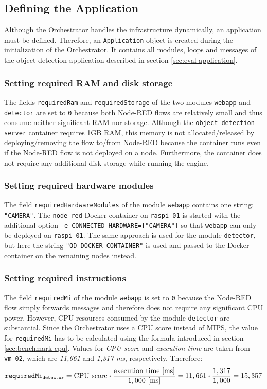 \subsection{Defining the Application\label{sec:eval-defining-application}}

Although the Orchestrator handles the infrastructure dynamically, an application must be defined. 
Therefore, an \texttt{Application} object is created during the initialization of the Orchestrator.
It contains all modules, loops and messages of the object detection application described in section \ref{sec:eval-application}.

\subsubsection*{Setting required RAM and disk storage}
The fields \texttt{requiredRam} and \texttt{requiredStorage} of the two modules \texttt{webapp} and \texttt{detector} are set to \texttt{0} because both Node-RED flows are relatively small and thus consume neither significant RAM nor storage.
Although the \texttt{object-detection-server} container requires 1GB RAM, this memory is not allocated/released by deploying/removing the flow to/from Node-RED because the container runs even if the Node-RED flow is not deployed on a node.
Furthermore, the container does not require any additional disk storage while running the engine.

\subsubsection*{Setting required hardware modules}
The field \texttt{requiredHardwareModules} of the module \texttt{webapp} contains one string: \texttt{"CAMERA"}.
The \texttt{node-red} Docker container on \texttt{raspi-01} is started with the additional option \texttt{-e CONNECTED\_HARDWARE=["CAMERA"]} so that \texttt{webapp} can only be deployed on \texttt{raspi-01}. The same approach is used for the module \texttt{detector}, but here the string \texttt{"OD-DOCKER-CONTAINER"} is used and passed to the Docker container on the remaining nodes instead.

\subsubsection*{Setting required instructions}
The field \texttt{requiredMi} of the module \texttt{webapp} is set to \texttt{0} because the Node-RED flow simply forwards messages and therefore does not require any significant CPU power.
However, CPU resources consumed by the module \texttt{detector} are substantial.
Since the Orchestrator uses a CPU score instead of MIPS, the value for \texttt{requiredMi} has to be calculated using the formula introduced in section \ref{sec:benchmark-cpu}.
Values for \textit{CPU score} and \textit{execution time} are taken from \texttt{vm-02}, which are \textit{11,661} and \textit{1,317 ms}, respectively.
Therefore:
\[\textrm{\texttt{requiredMi\textsubscript{detector}}} = \textrm{CPU score} \boldsymbol{\cdot} \frac{\textrm{execution time [ms]}}{1,000 \textrm{ [ms]}} = 11,661 \boldsymbol{\cdot} \frac{1,317}{1,000} = 15,357\]

